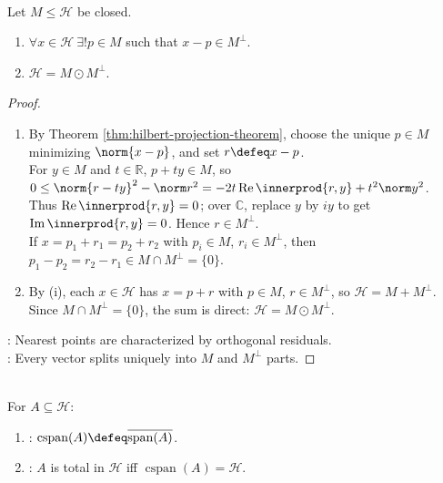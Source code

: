 \begin{corollary} \label{cor:hilbert-orthogonal-decomposition} \\
Let $M\leq\mathcal{H}$ be closed.
\begin{enumerate}[label=(\roman*)]
\setlength{\itemsep}{0pt}
\item $\forall x\in\mathcal{H}\ \exists!p\in M$ such that $x-p\in M^\perp$.
\item $\mathcal{H}=M\odot M^\perp$.
\end{enumerate}
\begin{proof}
\begin{enumerate}[label=(\roman*)]
\setlength{\itemsep}{0pt}
\item By Theorem \ref{thm:hilbert-projection-theorem}, choose the unique $p\in M$ minimizing $\norm{x-p}$, and set $r\defeq x-p$.\\
For $y\in M$ and $t\in\mathbb R$, $p+ty\in M$, so $0\leq\norm{r-ty}^2-\norm r^2=-2t\operatorname{Re}\innerprod{r,y}+t^2\norm y^2$.\\
Thus $\operatorname{Re}\innerprod{r,y}=0$; over $\mathbb C$, replace $y$ by $iy$ to get $\operatorname{Im}\innerprod{r,y}=0$. Hence $r\in M^\perp$.\\
If $x=p_1+r_1=p_2+r_2$ with $p_i\in M$, $r_i\in M^\perp$, then $p_1-p_2=r_2-r_1\in M\cap M^\perp=\{0\}$.
\item By (i), each $x\in\mathcal H$ has $x=p+r$ with $p\in M$, $r\in M^\perp$, so $\mathcal H=M+M^\perp$.\\
Since $M\cap M^\perp=\{0\}$, the sum is direct: $\mathcal H=M\odot M^\perp$.
\end{enumerate}
: Nearest points are characterized by orthogonal residuals.\\
: Every vector splits uniquely into $M$ and $M^\perp$ parts.
\end{proof}
\end{corollary}

\begin{definition} \label{def:closed-linear-span-hilbert} \\
For $A\subseteq\mathcal{H}$:
\begin{enumerate}[label=(\roman*)]
\setlength{\itemsep}{0pt}
\item {}: $\operatorname{cspan}(A)\defeq\overline{\operatorname{span}(A)}$.
\item {}: $A$ is total in $\mathcal{H}$ iff $\operatorname{cspan}(A)=\mathcal{H}$.
\end{enumerate}
\end{definition}


